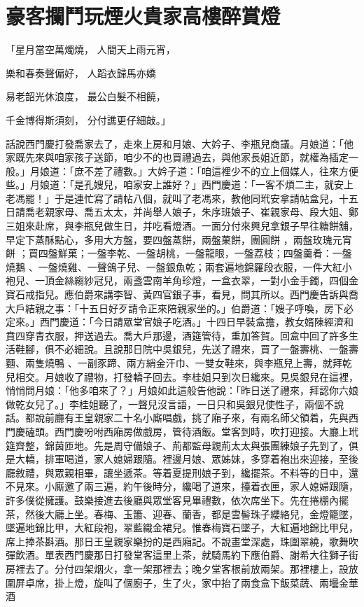 %

\chapter{豪客攔鬥玩煙火\KG 貴家高樓醉賞燈}

「星月當空萬燭燒，  人間天上雨元宵，

樂和春奏聲偏好，  人蹈衣歸馬亦嬌

易老韶光休浪度，  最公白髮不相饒，

千金博得斯須刻，  分付譙更仔細敲。」

話說西門慶打發喬家去了，走來上房和月娘、大妗子、李瓶兒商議。月娘道：「他家既先來與咱家孩子送節，咱少不的也買禮過去，與他家長姐近節，就權為插定一般。」月娘道：「庶不差了禮數。」大妗子道：「咱這裡少不的立上個媒人，往來方便些。」月娘道：「是孔嫂兒，咱家安上誰好？」西門慶道：「一客不煩二主，就安上老馮罷！」于是連忙寫了請帖八個，就叫了老馮來，教他同玳安拿請帖盒兒，十五日請喬老親家母、喬五太太，并尚舉人娘子，朱序班娘子、崔親家母、段大姐、鄭三姐來赴席，與李瓶兒做生日，并吃看燈酒。一面分付來興兒拿銀子早往糖餅舖，早定下蒸酥點心，多用大方盤，要四盤蒸餅，兩盤菓餅，團圓餅 ，兩盤玫瑰元宵餅 ；買四盤鮮菓；一盤李乾、一盤胡桃，一盤龍眼，一盤荔枝；四盤羹肴：一盤燒鵝 、一盤燒雞、一聲鴿子兒、一盤銀魚乾；兩套遍地錦羅段衣服，一件大紅小袍兒、一頂金絲縐紗冠兒，兩盞雲南羊角珍燈，一盒衣翠，一對小金手鐲，四個金寶石戒指兒。應伯爵來講李智、黃四官銀子事，看見，問其所以。西門慶告訴與喬大戶結親之事：「十五日好歹請令正來陪親家坐的。」伯爵道：「嫂子呼喚，房下必定來。」西門慶道：「今日請眾堂官娘子吃酒。」十四日早裝盒擔，教女婿陳經濟和賁四穿青衣服，押送過去。喬大戶那邊，酒筵管待，重加答賀。回盒中回了許多生活鞋腳，俱不必細說。且說那日院中吳銀兒，先送了禮來，買了一盤壽桃、一盤壽麵、兩隻燒鴨 、一副豕蹄、兩方綃金汗巾、一雙女鞋來，與李瓶兒上壽，就拜乾兒相交。月娘收了禮物，打發轎子回去。李桂姐只到次日纔來。見吳銀兒在這裡，悄悄問月娘：「他多咱來了？」月娘如此這般告他說：「昨日送了禮來，拜認你六娘做乾女兒了。」李桂姐聽了，一聲兒沒言語，一日只和吳銀兒使性子，兩個不說話。都說前廳有王皇親家二十名小廝唱戲，挑了廂子來，有兩名師父領着，先與西門慶磕頭。西門慶吩咐西廂房做戲房，管待酒飯。堂客到時，吹打迎接。大廳上玳筵齊整，錦茵匝地。先是周守備娘子、荊都監母親荊太太與張團練娘子先到了，俱是大轎，排軍喝道，家人媳婦跟隨。裡邊月娘、眾姊妹，多穿着袍出來迎接，至後廳敘禮，與眾親相畢，讓坐遞茶。等着夏提刑娘子到，纔擺茶。不料等的日中，還不見來。小廝邀了兩三遍，約午後時分，纔喝了道來，擡着衣匣，家人媳婦跟隨，許多僕從擁護。鼓樂接進去後廳與眾堂客見畢禮數，依次席坐下。先在捲棚內擺茶，然後大廳上坐。春梅、玉簫、迎春、蘭香，都是雲髻珠子纓絡兒，金燈籠墜，墜遍地錦比甲，大紅段袍，翠藍織金裙兒。惟春梅寶石墜子，大紅遍地錦比甲兒，席上捧茶斟酒。那日王皇親家樂扮的是西廂記。不說畫堂深處，珠圍翠繞，歌舞吹彈飲酒。單表西門慶那日打發堂客這里上茶，就騎馬約下應伯爵、謝希大往獅子街房裡去了。分付四架烟火，拿一架那裡去；晚夕堂客根前放兩架。那裡樓上，設放圍屏卓席，掛上燈，旋叫了個廚子，生了火，家中抬了兩食盒下飯菜蔬、兩壜金華酒 